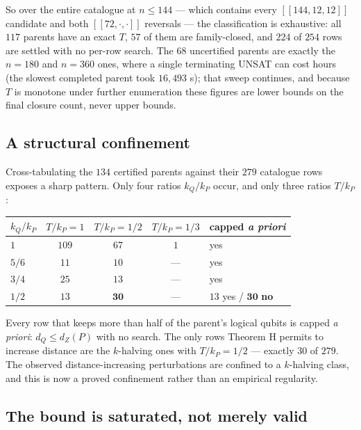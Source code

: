 \documentclass[11pt]{article}
\newcommand{\nk}[1]{[\![#1]\!]}
\theoremstyle{plain}
\theoremstyle{remark}
\begin{document}
So over the entire catalogue at $n\le 144$ --- which contains every $\nk{144,12,12}$
candidate and both $\nk{72,\cdot,\cdot}$ reversals --- the classification is exhaustive: all
$117$ parents have an exact $T$, $57$ of them are family-closed, and $224$ of $254$ rows
are settled with no per-row search. The $68$ uncertified parents are exactly the $n=180$
and $n=360$ ones, where a single terminating UNSAT can cost hours (the slowest completed
parent took $16{,}493$ s); that sweep continues, and because $T$ is monotone under further
enumeration these figures are lower bounds on the final closure count, never upper bounds.

\subsection{A structural confinement}\label{sec:confinement}

Cross-tabulating the $134$ certified parents against their $279$ catalogue rows exposes a
sharp pattern. Only four ratios $k_Q/k_P$ occur, and only three ratios $T/k_P$:

\begin{table}[ht]
\centering
\begin{tabular}{lcccl}
\toprule
$k_Q/k_P$ & $T/k_P=1$ & $T/k_P=1/2$ & $T/k_P=1/3$ & capped \emph{a priori} \\
\midrule
$1$ & $109$ & $67$ & $1$ & yes \\
$5/6$ & $11$ & $10$ & --- & yes \\
$3/4$ & $25$ & $13$ & --- & yes \\
$1/2$ & $13$ & $\mathbf{30}$ & --- & $13$ yes / $\mathbf{30}$ \textbf{no} \\
\bottomrule
\end{tabular}
\end{table}

Every row that keeps more than half of the parent's logical qubits is capped
\emph{a priori}: $d_Q\le d_Z(P)$ with no search. The only rows Theorem H permits to increase
distance are the $k$-halving ones with $T/k_P=1/2$ --- exactly $30$ of $279$. The observed
distance-increasing perturbations are confined to a $k$-halving class, and this is now a
proved confinement rather than an empirical regularity.

\subsection{The bound is saturated, not merely valid}\label{sec:saturation}
\end{document}
